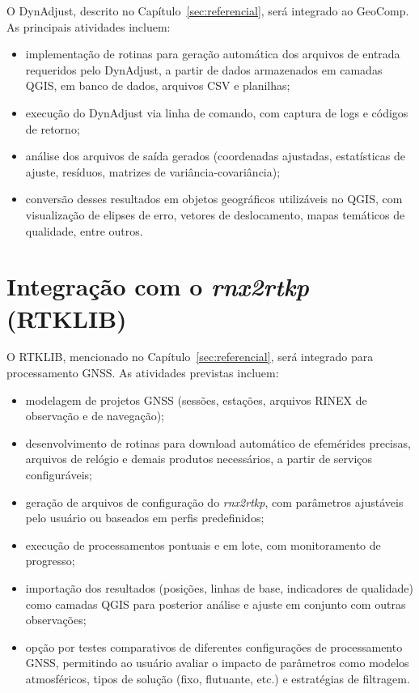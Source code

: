 \documentclass[
        12pt,                           %
        openright,                      %
        oneside,
        a4paper,                        %
        chapter=TITLE,         %
        section=TITLE,         %
        subsection=Title,      %
        english,                        %
        portugues,                      %
        ]{abntex2}
\begin{document}
O DynAdjust, descrito no Capítulo~\ref{sec:referencial}, será integrado ao GeoComp. As principais atividades incluem:

\begin{itemize}
    \item implementação de rotinas para geração automática dos arquivos de entrada requeridos pelo DynAdjust, a partir de dados armazenados em camadas QGIS, em banco de dados, arquivos CSV e planilhas;
    \item execução do DynAdjust via linha de comando, com captura de logs e códigos de retorno;
    \item análise dos arquivos de saída gerados (coordenadas ajustadas, estatísticas de ajuste, resíduos, matrizes de variância-covariância);
    \item conversão desses resultados em objetos geográficos utilizáveis no QGIS, com visualização de elipses de erro, vetores de deslocamento, mapas temáticos de qualidade, entre outros.
\end{itemize}


\section{Integração com o \textit{rnx2rtkp} (RTKLIB)}

O RTKLIB, mencionado no Capítulo~\ref{sec:referencial}, será integrado para processamento GNSS. As atividades previstas incluem:

\begin{itemize}
    \item modelagem de projetos GNSS (sessões, estações, arquivos RINEX de observação e de navegação);
    \item desenvolvimento de rotinas para download automático de efemérides precisas, arquivos de relógio e demais produtos necessários, a partir de serviços configuráveis;
    \item geração de arquivos de configuração do \textit{rnx2rtkp}, com parâmetros ajustáveis pelo usuário ou baseados em perfis predefinidos;
    \item execução de processamentos pontuais e em lote, com monitoramento de progresso;
    \item importação dos resultados (posições, linhas de base, indicadores de qualidade) como camadas QGIS para posterior análise e ajuste em conjunto com outras observações;
    \item opção por testes comparativos de diferentes configurações de processamento GNSS, permitindo ao usuário avaliar o impacto de parâmetros como modelos atmosféricos, tipos de solução (fixo, flutuante, etc.) e estratégias de filtragem.
\end{itemize}
\end{document}

